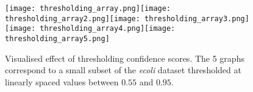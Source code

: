 \begin{figure}
\vspace*{-2mm}
\texttt{[image: thresholding\_array.png]}\texttt{[image: thresholding\_array2.png]}\texttt{[image: thresholding\_array3.png]}\texttt{[image: thresholding\_array4.png]}\texttt{[image: thresholding\_array5.png]}
\caption{Visualised effect of thresholding confidence scores.
The 5 graphs correspond to a small subset of the \textsl{ecoli} dataset thresholded at linearly spaced values between $0.55$ and $0.95$.}
\label{fig:thresholding_array}
\vspace*{-3mm}
\end{figure}
